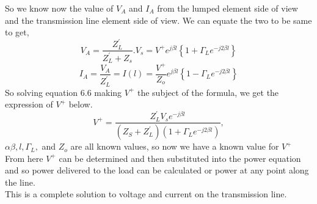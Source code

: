  So we know now the value of $V_A$ and $I_A$ from the lumped element side of view and the transmission line element side of view. We can equate the two to be same to get,
 \begin{equation} 
 V_A = \frac{Z^{'}_L}{Z^{'}_L + Z_s} . V_s = V^+ e^{j\beta l} \left\lbrace 1 + \Gamma_L e^{-j2\beta l} \right\rbrace 
 \end{equation}
 \begin{equation}
 I_A = \frac{V_A}{Z^{'}_L} = I(l) = \frac{V^+}{Z_o} e^{j\beta l} \left\lbrace 1 - \Gamma_L e^{-j2\beta l} \right\rbrace
 \end{equation}
 So solving equation $6.6$ making $V^{+}$ the subject of the formula, we get the expression of $V^+$ below. 
 \begin{equation} 
 V^+ = \frac{Z^{'}_L V_s e^{-j\beta l}}{(Z_S + Z^{'}_L)(1 + \Gamma_L e^{-j2\beta l })}, 
 \end{equation}
 $\alpha \beta , l  , \Gamma_L,$ and $Z_o$ are all known values, so now we have a known value for $V^+$\\
 
 From here $V^+$ can be determined and then substituted into the power equation and so power delivered to the load can be calculated or power at any point along the line.\\
 This is a complete solution to voltage and current on the transmission line.
 
